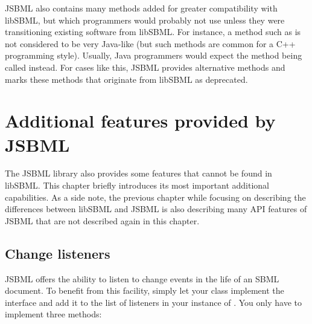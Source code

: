 JSBML also contains many methods added for greater compatibility with
libSBML, but which programmers would probably not use unless they were
transitioning existing software from libSBML.  For instance, a method such
as  is not considered to be very Java-like (but such
methods are common for a C++ programming style). Usually, Java
programmers would expect the method being called 
instead. For cases like this, JSBML provides alternative methods and marks
these methods that originate from libSBML as deprecated.


\chapter{Additional features provided by JSBML}
\label{chp:additional-jsbml-features}

The JSBML library also provides some features that cannot be found in libSBML.
This chapter briefly introduces its most important additional capabilities.
As a side note, the previous chapter while focusing on describing the differences
between libSBML and JSBML is also describing many API features of JSBML that
are not described again in this chapter.

\section{Change listeners}

JSBML offers the ability to listen to change events in the life of an SBML
document. To benefit from this facility, simply let your class implement
the interface \TreeNodeChangeListener and add it to the list of listeners
in your instance of \SBMLDocument. You only have to implement three
methods:

